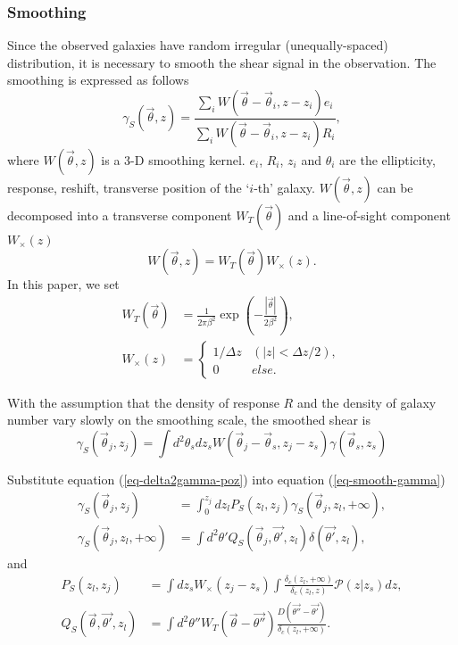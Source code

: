 \documentclass[twocolumn]{aastex62}
\newcommand{\vecb}[1]{{#1}}
\begin{document}
\subsubsection{Smoothing}
Since the observed galaxies have random irregular (unequally-spaced) distribution, it is necessary to smooth the shear signal in the observation. The smoothing is expressed as follows
\begin{equation}
\gamma_S  (\vec{\theta},z)  = \frac{\sum_i  W(\vec{\theta}-\vec{{\theta}}_i,z-z_i) e_i}{\sum_i W(\vec{\theta}-\vec{{\theta}}_i,z-z_i) R_i},
\end{equation}
where $W(\vec{\theta},z)$ is a $3$-D smoothing kernel. $e_i$, $R_i$, $z_i$ and $\theta_i$ are the ellipticity, response, reshift, transverse position of the `$i$-th' galaxy.
$W(\vec{\theta},z)$ can be decomposed into a transverse component $W_T(\vec{\theta})$ and a line-of-sight component $W_\times(z)$
\begin{equation}
W(\vec{\theta},z)=W_T(\vec{\theta}) W_\times (z).
\end{equation}
In this paper, we set
\begin{equation}
\begin{split}
W_T(\vec{\theta}) &=\frac{1}{2\pi\beta^2}\exp(-\frac{|\vec{\theta}|}{2\beta^2}),\\
W_\times (z) &=
\begin{cases}
1/\Delta z& (|z|<\Delta z/2),\\
0& else.
\end{cases}
\end{split}
\end{equation}

With the assumption that the density of response $R$ and the density of galaxy number vary slowly on the smoothing scale, the smoothed shear is
\begin{equation}\label{eq-smooth-gamma}
\gamma_S(\vec{\theta}_j,z_j)= \int d^2 \theta_s d z_sW(\vec{\theta}_j-\vec{{\theta}}_s,z_j-z_s) \gamma(\vec{\theta}_s,z_s)
\end{equation}

Substitute equation (\ref{eq-delta2gamma-poz}) into equation (\ref{eq-smooth-gamma})
\begin{equation}\label{eq-delta2gamma-smooth}
\begin{split}
\gamma_S(\vec{\theta}_j,z_j) &= \int_0^{z_j} dz_l P_S(z_l,z_j)\gamma_S(\vec{\theta}_j,z_l,+\infty),\\
\gamma_S(\vec{\theta}_j,z_l,+\infty)&= \int d^2 \theta'   Q_S(\vec{\theta}_j,\vec{\theta'},z_l) \delta(\vec{\theta'},z_l),
\end{split}
\end{equation}
and
\begin{equation}
\begin{split}
P_S(z_l,z_j)&=\int  dz_s W_\times (z_j-z_s) \int \frac{\delta_c(z_l,+\infty)}{\delta_{c}(z_l,z)} \mathcal{P}(z|z_s) dz,\\
Q_S(\vec{\theta},\vec{\theta'},z_l)&=\int d^2\theta'' W_T( \vec{\theta} -\vec{\theta''} )  \frac{\vecb{D}(\vec{\theta''}-\vec{\theta'})}{\delta_c(z_l,+\infty)}.
\end{split}
\end{equation}
\end{document}
